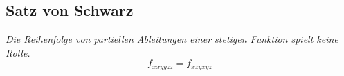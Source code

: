 \subsection{Satz von Schwarz}
    \textit{Die Reihenfolge von partiellen Ableitungen einer stetigen Funktion spielt keine Rolle.}
    $$
        f_{xxyyzz} = f_{xzyxyz}
    $$
    \vspace{-1em}
